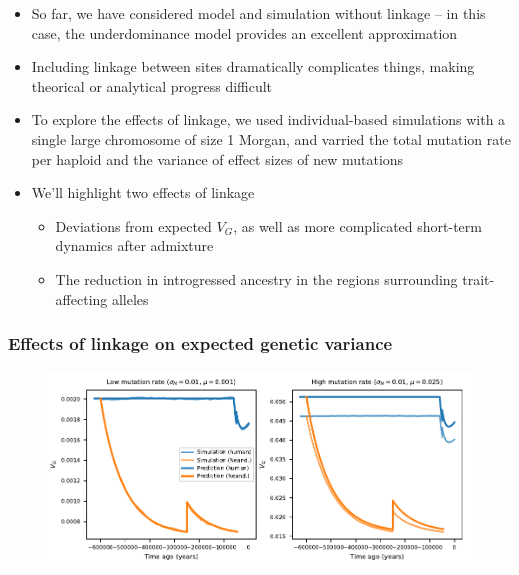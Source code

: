 \documentclass{article}
\begin{document}
\begin{itemize}
    \item So far, we have considered model and simulation without linkage -- in this
        case, the underdominance model provides an excellent approximation
    \item Including linkage between sites dramatically complicates things, making
        theorical or analytical progress difficult
    \item To explore the effects of linkage, we used individual-based simulations
        with a single large chromosome of size 1 Morgan, and varried the total
        mutation rate per haploid and the variance of effect sizes of new mutations
    \item We'll highlight two effects of linkage
        \begin{itemize}
            \item Deviations from expected $V_G$, as well as more complicated
                short-term dynamics after admixture
            \item The reduction in introgressed ancestry in the regions surrounding
                trait-affecting alleles
        \end{itemize}
\end{itemize}

\subsubsection*{Effects of linkage on expected genetic variance}

\begin{figure}[t!]
    \centering
    \includegraphics{../figures/model_comparison.SD_0.01.mu_0.001_0.025}
    \caption{}
    \label{fig:linkage-deviations}
\end{figure}
\end{document}
